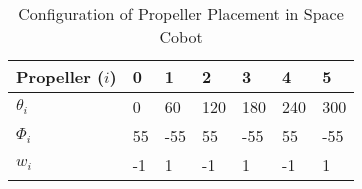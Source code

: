 \begin{table}[H]
\centering
\begin{tabular}{l|llllll}
Propeller (\(i\)) & 0  & 1   & 2   & 3    & 4   & 5   \\ \hline
\(\theta_{i}\)     & 0  & 60  & 120 & 180  & 240 & 300 \\
\(\Phi_{i}\)       & 55 & -55 & 55  & -55  & 55  & -55 \\
\(w_{i}\)          & -1 & 1   & -1  & 1    & -1  & 1   \\ \hline
\end{tabular}
\caption{Configuration of Propeller Placement in Space Cobot}
\label{tab:Proposed Aproach: Space Cobot Motor and propeller configuration}
\end{table}

